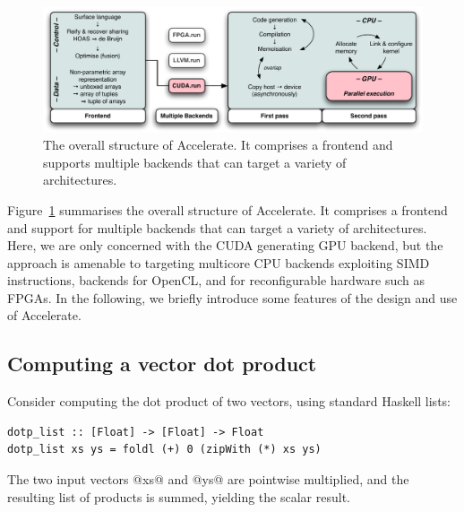 \begin{figure}
    \centering
    \includegraphics[width=\textwidth]{images/sec-3/outline-s}
    \caption[The overall structure of Accelerate]{The overall structure of
    Accelerate. It comprises a frontend and supports multiple backends that can
    target a variety of architectures.}
    \label{fig:outline}
\end{figure}

Figure~\ref{fig:outline} summarises the overall structure of Accelerate. It
comprises a frontend and support for multiple backends that can target a variety
of architectures. Here, we are only concerned with the CUDA generating GPU
backend, but the approach is amenable to targeting multicore CPU backends
exploiting SIMD instructions, backends for OpenCL, and for reconfigurable
hardware such as FPGAs. In the following, we briefly introduce some features of
the design and use of Accelerate.


\subsection{Computing a vector dot product}
\label{sec:computing_dotp}

Consider computing the dot product of two vectors, using standard Haskell lists:
%
\begin{lstlisting}[style=haskell]
dotp_list :: [Float] -> [Float] -> Float
dotp_list xs ys = foldl (+) 0 (zipWith (*) xs ys)
\end{lstlisting}
%
The two input vectors @xs@ and @ys@ are pointwise multiplied, and the resulting
list of products is summed, yielding the scalar result.


